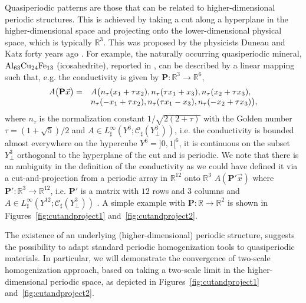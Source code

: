 \documentclass[a4paper,reqno]{amsart}
\numberwithin{equation}{section}
\numberwithin{equation}{section}		%
\numberwithin{figure}{section}			%
\numberwithin{table}{section}				%
\newcommand{\R}{\mathbb{R}}
\theoremstyle{definition}
\newcommand{\<}{\ensuremath \leq}
\renewcommand{\>}{\ensuremath \geq}
\begin{document}
Quasiperiodic patterns are those that can be related to higher-dimensional periodic structures. This is achieved by taking a cut along a hyperplane in the higher-dimensional space and projecting onto the lower-dimensional physical space, which is typically $\R^3$. This was proposed by the physicists Duneau and Katz forty years ago \cite{Duneau+Katz1985}. For example, the naturally occurring quasiperiodic mineral,  
$\rm{Al}_{63}\rm{Cu}_{24}\rm{Fe}_{13}$ (icosahedrite),  reported in  \cite{bindi2009}, can be described by a linear mapping such that, e.g. the conductivity is given by
  $\textbf{P}: \R^3 \to \R^6$,
\begin{equation*}
\begin{array}{ll}
A \bigl
( \textbf{P}\vec{x} \bigr )
= &
A \bigl ( n_\tau(x_1 + \tau x_2), n_\tau(\tau x_1 + x_3), n_\tau(x_2 +
\tau x_3), \cr & n_\tau(-x_1 + \tau x_2), n_\tau(\tau x_1 - x_3),
n_\tau(-x_2 + \tau x_3) \bigr ), \cr
\end{array}
\end{equation*}
where $n_{\tau}$ is the normalization constant
$1/\sqrt{2(2+\tau)}$ with the Golden
number  $\tau=(1+\sqrt{5})/2$
and $A \in L^{\infty}_{\sharp}(Y^6; \mathcal{C}_\sharp(Y_\perp^3))$, i.e. the conductivity is bounded almost everywhere on the hypercube $Y^6={]0,1[}^6$, it is continuous on the subset $Y_\perp^3$ orthogonal to the hyperplane of the cut
and is periodic. We note that there is an
ambiguity in the definition of the conductivity as we
could have defined it via a cut-and-projection
from a periodic array in $\R^{12}$ onto $\R^3$ $A(\textbf{P}' \vec{x})$ where $\textbf{P}': \R^3 \to \R^{12}$, i.e. $\textbf{P}'$ is a matrix with $12$ rows and $3$ columns and $A\in L^{\infty}_{\sharp}(Y^{12};\mathcal{C}_\sharp(Y_\perp^3))$ \cite{Duneau+Katz1985}. A simple example with $\textbf{P}:\R\to\R^2$ is shown in Figures~\ref{fig:cutandproject1} and~\ref{fig:cutandproject2}.


The existence of an underlying (higher-dimensional) periodic structure, suggests the possibility to adapt standard periodic homogenization tools to quasiperiodic materials. In particular, we will demonstrate the convergence of two-scale homogenization approach, based on taking a two-scale limit in the higher-dimensional periodic space, as depicted in Figures~\ref{fig:cutandproject1} and~\ref{fig:cutandproject2}.
\end{document}
